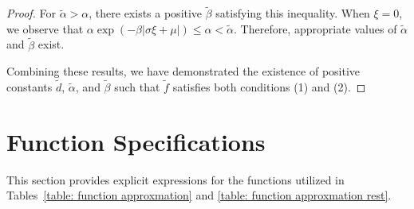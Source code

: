 \begin{proof}
For $\tilde{\alpha}>\alpha$, there exists a positive $\tilde{\beta}$ satisfying this inequality. When $\xi=0$, we observe that $\alpha \exp (-\beta|\sigma\xi+\mu|) \leq \alpha < \tilde{\alpha}$. Therefore, appropriate values of $\tilde{\alpha}$ and $\tilde{\beta}$ exist.

Combining these results, we have demonstrated the existence of positive constants $\tilde{d}$, $\tilde{\alpha}$, and $\tilde{\beta}$ such that $\tilde{f}$ satisfies both conditions (1) and (2).
\end{proof}

\section{Function Specifications}\label{Appendix: details of approximate functions}
This section provides explicit expressions for the functions utilized in Tables~\ref{table: function approxmation} and \ref{table: function approxmation rest}.


